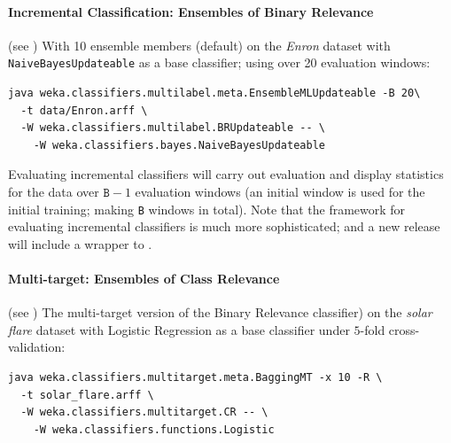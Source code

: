 \documentclass[11pt]{article}
\newcommand{\MEKA}{Meka}
\newcommand{\MOA}{Moa}
\begin{document}


\paragraph{Incremental Classification: Ensembles of Binary Relevance} (see \cite{ECC2,MEDS2}) With 10 ensemble members (default) on the \textit{Enron} dataset with \texttt{NaiveBayesUpdateable} as a base classifier; using over 20 evaluation windows:

\begin{verbatim}
java weka.classifiers.multilabel.meta.EnsembleMLUpdateable -B 20\
  -t data/Enron.arff \
  -W weka.classifiers.multilabel.BRUpdateable -- \
    -W weka.classifiers.bayes.NaiveBayesUpdateable
\end{verbatim}

Evaluating incremental classifiers will carry out evaluation and display statistics for the data over $\texttt{B}-1$ evaluation windows (an initial window is used for the initial training; making \texttt{B} windows in total). Note that the \framework{\MOA} framework \cite{MOA} for evaluating incremental classifiers is much more sophisticated; and a new release will include a wrapper to \framework{\MEKA}. 

\paragraph{Multi-target: Ensembles of Class Relevance} (see \cite{UPM}) The multi-target version of the Binary Relevance classifier) on the \textit{solar flare} dataset with Logistic Regression as a base classifier under $5$-fold cross-validation:
\begin{verbatim}
java weka.classifiers.multitarget.meta.BaggingMT -x 10 -R \
  -t solar_flare.arff \
  -W weka.classifiers.multitarget.CR -- \
    -W weka.classifiers.functions.Logistic
\end{verbatim}
\end{document}
